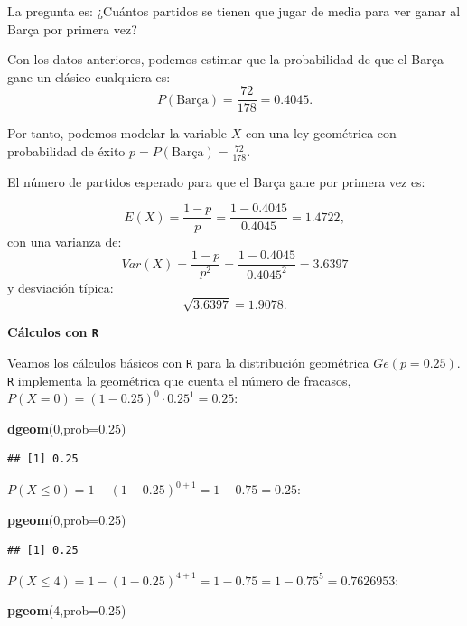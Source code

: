 \documentclass[]{book}
\newenvironment{Shaded}{\begin{snugshade}}{\end{snugshade}}
\newcommand{\DataTypeTok}[1]{\textcolor[rgb]{0.13,0.29,0.53}{#1}}
\newcommand{\DecValTok}[1]{\textcolor[rgb]{0.00,0.00,0.81}{#1}}
\newcommand{\FloatTok}[1]{\textcolor[rgb]{0.00,0.00,0.81}{#1}}
\newcommand{\KeywordTok}[1]{\textcolor[rgb]{0.13,0.29,0.53}{\textbf{#1}}}
\newcommand{\NormalTok}[1]{#1}
\begin{document}
La pregunta es: ¿Cuántos partidos se tienen que jugar de media para ver ganar al Barça por primera vez?

Con los datos anteriores, podemos estimar que la probabilidad de que el Barça gane un clásico cualquiera es:
\[P(\mbox{Barça})=\frac{72}{178}=0.4045.\]

Por tanto, podemos modelar la variable \(X\) con una ley geométrica con probabilidad de éxito \(p=P(\mbox{Barça})=\frac{72}{178}.\)

El número de partidos esperado para que el Barça gane por primera vez es:

\[E(X)=\frac{1-p}{p}=\frac{1-0.4045}{0.4045}=1.4722,\]
con una varianza de:
\[Var(X)=\frac{1-p}{p^2}=\frac{1-0.4045}{0.4045^2}=3.6397\]
y desviación típica:
\[\sqrt{3.6397}=1.9078.\]

\textbf{Cálculos con \texttt{R}}

Veamos los cálculos básicos con \texttt{R} para la distribución geométrica \(Ge(p=0.25)\). \texttt{R} implementa la geométrica que cuenta el número de fracasos, \(P(X=0)=(1-0.25)^0\cdot 0.25^1=0.25\):

\begin{Shaded}
\begin{Highlighting}[]
\KeywordTok{dgeom}\NormalTok{(}\DecValTok{0}\NormalTok{,}\DataTypeTok{prob=}\FloatTok{0.25}\NormalTok{)}
\end{Highlighting}
\end{Shaded}

\begin{verbatim}
## [1] 0.25
\end{verbatim}

\(P(X\leq 0)=1- (1-0.25)^{0+1}=1-0.75=0.25\):

\begin{Shaded}
\begin{Highlighting}[]
\KeywordTok{pgeom}\NormalTok{(}\DecValTok{0}\NormalTok{,}\DataTypeTok{prob=}\FloatTok{0.25}\NormalTok{)}
\end{Highlighting}
\end{Shaded}

\begin{verbatim}
## [1] 0.25
\end{verbatim}

\(P(X\leq 4)=1-(1-0.25)^{4+1}=1-0.75=1-0.75^5=0.7626953\):

\begin{Shaded}
\begin{Highlighting}[]
\KeywordTok{pgeom}\NormalTok{(}\DecValTok{4}\NormalTok{,}\DataTypeTok{prob=}\FloatTok{0.25}\NormalTok{)}
\end{Highlighting}
\end{Shaded}
\end{document}
